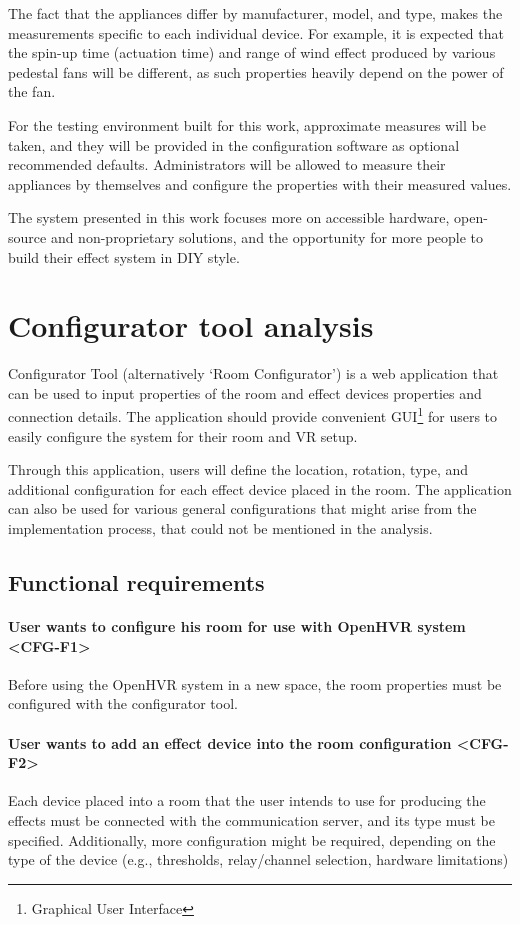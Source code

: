 The fact that the appliances differ by manufacturer, model, and type,
makes the measurements specific to each individual device.
For example, it is expected that the spin-up time
(actuation time) and range of wind effect produced by various pedestal fans
will be different, as such properties heavily depend on the power of the fan.

\pagebreak

For the testing environment built for this work, approximate measures will be
taken, and they will be provided in the configuration software as optional
recommended defaults. Administrators will be allowed
to measure their appliances by themselves and configure the properties with
their measured values.


The system presented in this work focuses more
on accessible hardware, open-source and non-proprietary solutions, and
the opportunity for more people to build their effect system in DIY style.


\section{Configurator tool analysis}\label{analysis:conftool}
Configurator Tool (alternatively `Room Configurator') is a web application that
can be used to input properties of the room and effect devices properties and
connection details.
The application should provide convenient GUI\footnote{Graphical User Interface}
for users to easily configure the system for their room and VR setup.


Through this application, users will define the location, rotation, type, and
additional configuration for each effect device placed in the room. The application
can also be used for various general configurations that might arise from
the implementation process, that could not be mentioned in the analysis.


\subsection{Functional requirements}
\paragraph*{User wants to configure his room for use with OpenHVR system <CFG-F1>}
Before using the OpenHVR system in a new space,
the room properties must be configured with the configurator tool.


\paragraph*{User wants to add an effect device into the room configuration <CFG-F2>}
Each device placed into a room that the user intends to use for producing the effects
must be connected with the communication server, and its type must be specified.
Additionally, more configuration might be required, depending on the type
of the device (e.g., thresholds, relay/channel selection, hardware limitations)


